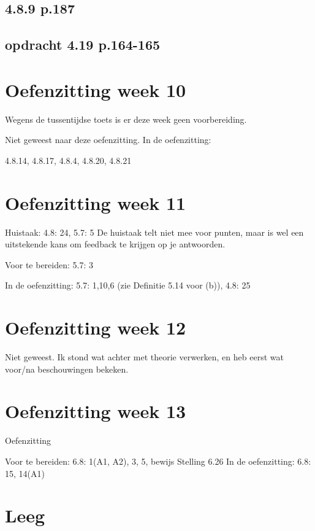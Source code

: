 \documentclass{article}
\begin{document}
\subsection{4.8.9 p.187}

\subsection{opdracht 4.19 p.164-165}

\section{Oefenzitting week 10} 

Wegens de tussentijdse toets is er deze week geen voorbereiding.

Niet geweest naar deze oefenzitting. 
In de oefenzitting: 

4.8.14, 
4.8.17, 
4.8.4, 
4.8.20, 
4.8.21


\section{Oefenzitting week 11}

Huistaak: 
4.8: 24, 5.7: 5 
De huistaak telt niet mee voor punten, maar is wel een uitstekende kans om feedback te krijgen op je antwoorden.

Voor te bereiden: 
5.7: 3

In de oefenzitting: 
5.7: 1,10,6 (zie Definitie 5.14 voor (b)), 4.8: 25

\section{Oefenzitting week 12}

Niet geweest. Ik stond wat achter met theorie verwerken, en heb eerst wat voor/na beschouwingen bekeken. 

\section{Oefenzitting week 13}
Oefenzitting

    Voor te bereiden: 6.8: 1(A1, A2), 3, 5, bewijs Stelling 6.26
    In de oefenzitting:  6.8: 15, 14(A1)
    

\section{Leeg} 
\end{document}
